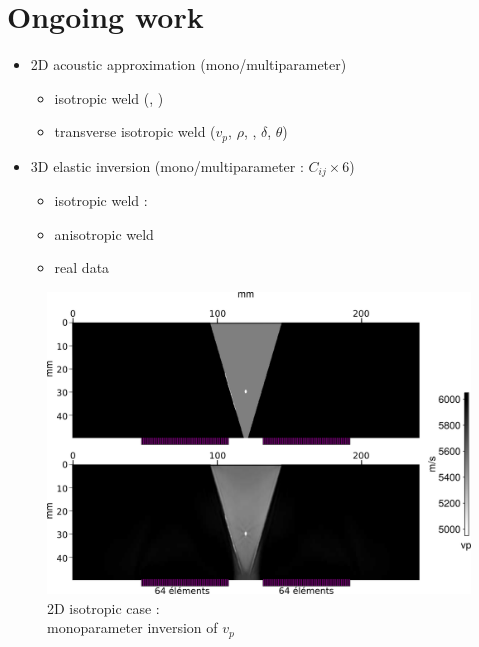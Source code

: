 \documentclass[11pt,xcolor=x11names,compress, notes=show]{beamer}%
\begin{document}
\section{Ongoing work}
\begin{frame}{\insertsectionhead}
	\begin{itemize}
		\item 2D acoustic approximation (mono/multiparameter)
		\begin{itemize}
			\item isotropic weld (, )
			\item transverse isotropic weld ($v_{p}$, $\rho$, , $\delta$, $\theta$)
		\end{itemize}
		\item 3D elastic inversion (mono/multiparameter : $C_{ij}\times$6)
		\begin{itemize}
			\item isotropic weld : 
			\item anisotropic weld
			\item real data
		\end{itemize}		
	\end{itemize}
\end{frame}

\begin{frame}
	\begin{figure}
		\includegraphics[scale=0.3]{img/vp.png}\\[0.5cm]
		{2D isotropic case :\\  monoparameter inversion of $v_{p}$}
	\end{figure}
	
\end{frame}
\end{document}
